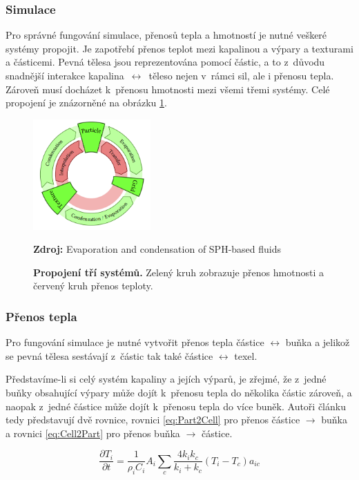 \subsubsection{Simulace}
Pro správné fungování simulace, přenosů tepla a hmotností je nutné veškeré systémy propojit. Je zapotřebí přenos teplot mezi kapalinou a výpary a texturami a částicemi. Pevná tělesa jsou reprezentována pomocí částic, a to z~důvodu snadnější interakce kapalina~$\leftrightarrow$~\mbox{těleso} nejen v~rámci sil, ale i přenosu tepla. Zároveň musí docházet k~přenosu hmotnosti mezi všemi třemi systémy. Celé propojení je znázorněné na obrázku \ref{fig:EvapCycle}.

\begin{figure}[hbt]
	\centering
	\captionsetup{justification=centering}
	\includegraphics[width=0.4\textwidth]{obrazky-figures/evapCycle.PNG}
	\caption{\textbf{Propojení tří systémů.} Zelený kruh zobrazuje přenos hmotnosti a červený kruh přenos teploty.}
	\textbf{Zdroj: } Evaporation and condensation of SPH-based fluids \cite{Evap&Cond}
	\label{fig:EvapCycle}
\end{figure}

\subsubsection{Přenos tepla}
Pro fungování simulace je nutné vytvořit přenos tepla částice $\leftrightarrow$ buňka a jelikož se pevná tělesa sestávají z~částic tak také částice $\leftrightarrow$ texel. 

Představíme-li si celý systém kapaliny a jejích výparů, je zřejmé, že z~jedné buňky obsahující výpary může dojít k~přenosu tepla do několika částic zároveň, a naopak z~jedné částice může dojít k~přenosu tepla do více buněk. Autoři článku tedy představují dvě rovnice, rovnici \ref{eq:Part2Cell} pro přenos částice $\rightarrow$ buňka a rovnici \ref{eq:Cell2Part} pro přenos buňka $\rightarrow$ částice.

\begin{equation}
    \frac{\partial T_i}{\partial t} = \frac{1}{\rho_i C_i} A_i \sum_c \frac{4 k_i k_c}{k_i + k_c}(T_i - T_c)a_{ic}
    \label{eq:Part2Cell}
\end{equation}

